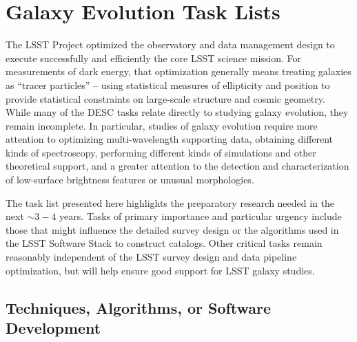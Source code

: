 
\section{Galaxy Evolution Task Lists}\label{sec:tasks:gal:intro}  
{\justify
The LSST Project optimized the observatory and data management design
to execute successfully and efficiently the core LSST science mission. 
For measurements
of dark energy, that optimization generally means treating galaxies as ``tracer particles'' --
 using statistical measures of ellipticity and position to provide statistical
constraints on large-scale structure and cosmic geometry. While many of the
DESC tasks relate directly to studying galaxy evolution, they remain 
incomplete. In particular, studies of galaxy evolution require more attention to 
optimizing multi-wavelength supporting data, obtaining different kinds of spectroscopy, 
performing different
kinds of simulations and other theoretical support, and a greater attention to 
the detection
and characterization of low-surface brightness features or unusual morphologies.

The task list presented here highlights the preparatory research needed in the next $\sim3-4$
years.
Tasks of primary importance and particular urgency include those that might influence the detailed survey
design or the algorithms used in the LSST Software Stack to construct catalogs. 
Other critical tasks remain reasonably independent of the
LSST survey design and data pipeline optimization, but will help ensure good support for
LSST galaxy studies.

\subsection{Techniques, Algorithms, or Software Development} \label{sec:tasks:gal:techniques_and_algorithms}

}
